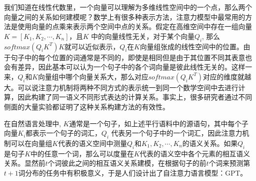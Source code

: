 \documentclass[twoside,a4paper,12pt]{book}%
\begin{document}
我们知道在线性代数里，一个向量可以理解为多维线性空间中的一个点，那么两个向量之间的关系如何建模呢？数学上有很多种表示方法，注意力模型中最常用的方法是使用向量的点乘来表示两个空间中点的关系。假定在高维空间中存在一组向量$K=[K_1,K_2,\cdots,K_n]$，且$K$ 中的向量线性无关，对于某个向量$Q_i$, 那么$softmax(Q_iK^T)K$就可以近似表示，$Q_i$在$K$向量组张成的线性空间中的位置。由于句子中的每个位置的词通常是不同的，即使是相同但是由于其位置不同其表意也会有差异，因此基本可以认为一个句子中的各个词向量是彼此线性无关的。这样一来，$Q_i$和$K$向量组中哪个向量关系大，那么对应$softmax(Q_iK^T)$对应的维度就越大。可以说注意力机制将两种不同方式的表示统一到同一个数学空间中去进行计算，因此构建了同一语义不同形式表达的计算关系。事实上，很多研究者通过不同侧面的大量实验都证明了这种关系构建方法的有效性。

在自然语言处理中,  $K$通常是一个句子，如上述平行语料中的源语句，其中每个子向量$K_i$都表示一个句子的词汇，$Q_i$ 代表另一个句子中的一个词汇，因此注意力机制可以在向量组$K$代表的语义空间中测量$Q_i$和$K_1,K_2,\cdots,K_n$的语义关系。如果$Q_i$ 是句子$K$中的任意一个词，那么可以度量在$K$代表的语义空中各个元素的相互语义关系。显然前$t$个词彼此之间的相互语义关系建模，在根据句子的前$t$个词来预测第$t+1$词分布的任务中有积极意义，于是人们设计出了自注意力语言模型：\gls{GPT}。
\end{document}
